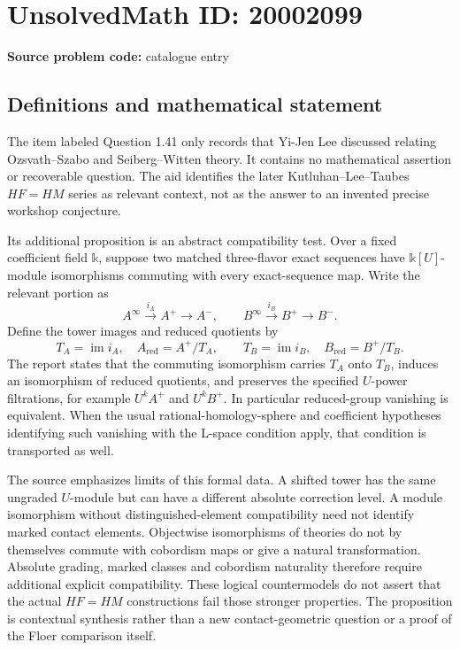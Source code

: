 \documentclass[11pt]{article}
\begin{document}
\section*{UnsolvedMath ID: 20002099}
\textbf{Source problem code:} catalogue entry
\subsection{Definitions and mathematical statement}
The item labeled Question 1.41 only records that Yi-Jen Lee discussed relating Ozsvath--Szabo and Seiberg--Witten theory. It contains no mathematical assertion or recoverable question. The aid identifies the later Kutluhan--Lee--Taubes \(HF=HM\) series as relevant context, not as the answer to an invented precise workshop conjecture.

Its additional proposition is an abstract compatibility test. Over a fixed coefficient field \(\mathbb k\), suppose two matched three-flavor exact sequences have \(\mathbb k[U]\)-module isomorphisms commuting with every exact-sequence map. Write the relevant portion as
\[
 A^\infty\xrightarrow{i_A}A^+\longrightarrow A^-,\qquad
 B^\infty\xrightarrow{i_B}B^+\longrightarrow B^-.
\]
Define the tower images and reduced quotients by
\[
 T_A=\operatorname{im}i_A,\quad A_{\mathrm{red}}=A^+/T_A,
 \qquad T_B=\operatorname{im}i_B,\quad B_{\mathrm{red}}=B^+/T_B.
\]
The report states that the commuting isomorphism carries \(T_A\) onto \(T_B\), induces an isomorphism of reduced quotients, and preserves the specified \(U\)-power filtrations, for example \(U^kA^+\) and \(U^kB^+\). In particular reduced-group vanishing is equivalent. When the usual rational-homology-sphere and coefficient hypotheses identifying such vanishing with the L-space condition apply, that condition is transported as well.

The source emphasizes limits of this formal data. A shifted tower has the same ungraded \(U\)-module but can have a different absolute correction level. A module isomorphism without distinguished-element compatibility need not identify marked contact elements. Objectwise isomorphisms of theories do not by themselves commute with cobordism maps or give a natural transformation. Absolute grading, marked classes and cobordism naturality therefore require additional explicit compatibility. These logical countermodels do not assert that the actual \(HF=HM\) constructions fail those stronger properties. The proposition is contextual synthesis rather than a new contact-geometric question or a proof of the Floer comparison itself.
\end{document}
